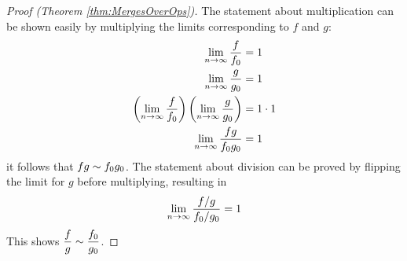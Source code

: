 \begin{proof}[Proof (Theorem \ref{thm:MergesOverOps})]
	
	The statement about multiplication can be shown easily by multiplying the limits corresponding to $f$ and $g$:
	\begin{align*}
	\lim_{n \to \infty} \frac{f}{f_0} &= 1\\
	\lim_{n \to \infty} \frac{g}{g_0} &= 1\\
	\left( \lim_{n \to \infty} \frac{f}{f_0} \right) \left( \lim_{n \to \infty} \frac{g}{g_0} \right) &= 1 \cdot 1\\
	\lim_{n \to \infty} \frac{fg}{f_0g_0} &= 1
	\end{align*}
	it follows that $fg \sim f_0g_0$. The statement about division can be proved by flipping the limit for $g$ before multiplying, resulting in
	\begin{align*}
	\lim_{n \to \infty} \frac{f / g}{f_0 / g_0} = 1
	\end{align*}
	This shows $\dfrac f g \sim \dfrac {f_0} {g_0}$.
\end{proof}